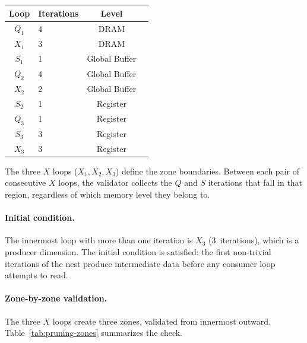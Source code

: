 \begin{center}
\small
\begin{tabular}{c l c l}
  \toprule
  \textbf{Loop} & \textbf{Iterations} & \textbf{Level} \\
  \midrule
    $Q_1$ & 4 & DRAM \\
    $X_1$ & 3 & DRAM \\
    $S_1$ & 1 & Global Buffer \\
    $Q_2$ & 4 & Global Buffer \\
    $X_2$ & 2 & Global Buffer \\
    $S_2$ & 1 & Register \\
    $Q_3$ & 1 & Register \\
    $S_3$ & 3 & Register \\
    $X_3$ & 3 & Register \\
  \bottomrule
\end{tabular}
\end{center}

\noindent
The three $X$ loops ($X_1, X_2, X_3$) define the zone boundaries.
Between each pair of consecutive $X$ loops, the validator collects the
$Q$ and $S$ iterations that fall in that region, regardless of which
memory level they belong to.

\paragraph{Initial condition.}
The innermost loop with more than one iteration is $X_3$
(3~iterations), which is a producer dimension.
The initial condition is satisfied: the first non-trivial iterations
of the nest produce intermediate data before any consumer loop
attempts to read.

\paragraph{Zone-by-zone validation.}
The three $X$ loops create three zones, validated from innermost
outward.
Table~\ref{tab:pruning-zones} summarizes the check.

